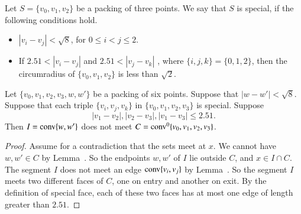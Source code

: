 \begin{tarskidata}
\begin{tarski}
\begin{definition}[special] 
Let $S=\{v_0,v_1,v_2\}$ be a packing of three
points.  We say that $S$ is special, if
the following conditions hold.  
\begin{itemize}
  \item $|v_i-v_j|<\sqrt8$, for
$0\le i< j \le 2$.  
   \item If $2.51 < |v_i-v_j|$ and $2.51 < |v_j-v_k|$ ,
   where $\{i,j,k\} = \{0,1,2\}$, then
  the circumradius of $\{v_0,v_1,v_2\}$ is less than $\sqrt2$.
  \end{itemize}
\end{definition}
\end{tarski}



\begin{tarski}

\begin{lemma}
Let $\{v_0,v_1,v_2,v_3,w,w'\}$ be a packing of six points. Suppose that
$|w-w'| < \sqrt8$.  Suppose that each triple $\{v_i,v_j,v_k\}$
in $\{v_0,v_1,v_2,v_3\}$ is special. 
Suppose   %
   $$
   |v_1-v_2|,|v_2-v_3|,|v_1-v_3|\le 2.51.
   $$
Then $I={\operatorname{conv}}\{w,w'\}$ does not meet $C={\operatorname{conv}}^0\{v_0,v_1,v_2,v_3\}$.
\end{lemma}


\begin{proof}  Assume for a contradiction that the sets meet at $x$.
We cannot have $w,w'\in C$ by
Lemma~.  So the endpoints $w,w'$ of $I$
lie outside $C$, and  $x\in I\cap C$.
The segment $I$ does not meet an edge ${\operatorname{conv}}\{v_i,v_j\}$
by Lemma~.  So the segment $I$ meets
two different faces of $C$, one on entry and another on exit.
By the definition of special face, each of these two faces has at most
one edge of length greater than $2.51$.  


\end{proof}
\end{tarski}
\end{tarskidata}

